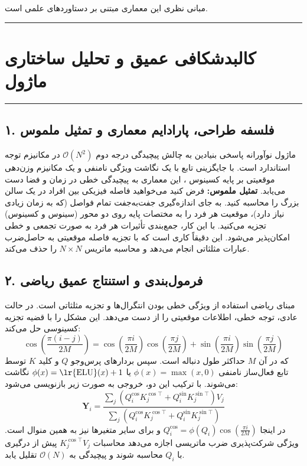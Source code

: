 \clearpage
{}
\vspace*{0.2cm}

مبانی نظری این معماری مبتنی بر دستاوردهای علمی \cite{qin2022cosformer} است.
\noindent\rule{\textwidth}{1.2pt}
\vspace*{0.1cm}
\section{کالبدشکافی عمیق و تحلیل ساختاری ماژول }
\label{sec:mod_cosformer}
\vspace*{-0.2cm}
\noindent\rule{\textwidth}{0.5pt}
\vspace*{0.3cm}

\subsection*{۱. فلسفه طراحی، پارادایم معماری و تمثیل ملموس}
ماژول نوآورانه  پاسخی بنیادین به چالش پیچیدگی درجه دوم $\mathcal{O}(N^2)$ در مکانیزم توجه استاندارد است. با جایگزینی تابع  با یک نگاشت ویژگی نامنفی  و یک مکانیزم وزن‌دهی موقعیتی بر پایه کسینوس ، این معماری به پیچیدگی خطی در زمان و فضا دست می‌یابد. 
\textbf{تمثیل ملموس:} فرض کنید می‌خواهید فاصله فیزیکی بین افراد در یک سالن بزرگ را محاسبه کنید. به جای اندازه‌گیری جفت‌به‌جفت تمام فواصل (که به زمان زیادی نیاز دارد)، موقعیت هر فرد را به مختصات پایه روی دو محور (سینوس و کسینوس) تجزیه می‌کنید. با این کار، جمع‌بندی تأثیرات هر فرد به صورت تجمعی و خطی امکان‌پذیر می‌شود. این دقیقاً کاری است که  با تجزیه فاصله موقعیتی به حاصل‌ضرب عبارات مثلثاتی انجام می‌دهد و محاسبه ماتریس $N \times N$ را حذف می‌کند.

\subsection*{۲. فرمول‌بندی و استنتاج عمیق ریاضی }
مبنای ریاضی  استفاده از ویژگی خطی بودن انتگرال‌ها و تجزیه مثلثاتی است. در حالت عادی، توجه خطی، اطلاعات موقعیتی را از دست می‌دهد.  این مشکل را با قضیه تجزیه کسینوسی حل می‌کند:
\begin{equation}
\cos\left(\frac{\pi (i - j)}{2 M}\right) = \cos\left(\frac{\pi i}{2 M}\right)\cos\left(\frac{\pi j}{2 M}\right) + \sin\left(\frac{\pi i}{2 M}\right)\sin\left(\frac{\pi j}{2 M}\right)
\end{equation}
که در آن $M$ حداکثر طول دنباله است. سپس بردارهای پرس‌وجو $Q$ و کلید $K$ توسط تابع فعال‌ساز نامنفی $\phi(x) = \max(x, 0)$ یا $\phi(x) = \text{\lr{ELU}}(x) + 1$ نگاشت می‌شوند. با ترکیب این دو، خروجی به صورت زیر بازنویسی می‌شود:
\begin{equation}
\mathbf{Y}_i = \frac{\sum_{j} \left( Q_i^{\cos} K_j^{\cos \top} + Q_i^{\sin} K_j^{\sin \top} \right) V_j}{\sum_{j} \left( Q_i^{\cos} K_j^{\cos \top} + Q_i^{\sin} K_j^{\sin \top} \right)}
\end{equation}
در اینجا $Q_i^{\cos} = \phi(Q_i)\cos\left(\frac{\pi i}{2 M}\right)$ و برای سایر متغیرها نیز به همین منوال است. ویژگی شرکت‌پذیری ضرب ماتریسی اجازه می‌دهد محاسبات $K_j^{\cos \top} V_j$ پیش از درگیری با $Q_i$ محاسبه شوند و پیچیدگی به $\mathcal{O}(N)$ تقلیل یابد.

